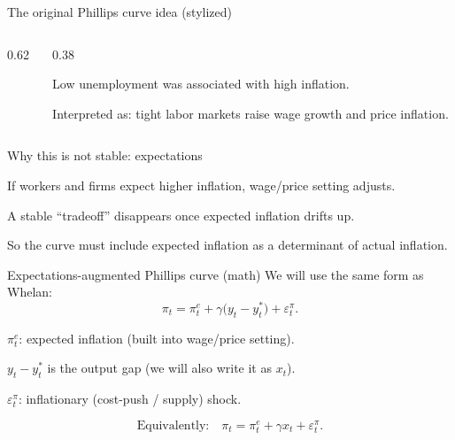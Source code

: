 \documentclass[aspectratio=169,xcolor=dvipsnames]{beamer}
\let\tempone\itemize
\let\temptwo\enditemize
\renewenvironment{itemize}{\tempone\addtolength{\itemsep}{\fill}}{\temptwo}
\newcommand{\axes}[4]{%
  \draw[axis] (#1,0) -- (#2,0);
  \draw[axis] (0,#3) -- (0,#4);
}
\newcommand{\xlabel}[1]{\node[below right] at (2.75,0) {#1};}
\newcommand{\ylabel}[1]{\node[above left] at (0,3.95) {#1};}
\begin{document}
\begin{frame}{The original Phillips curve idea (stylized)}
\begin{columns}
\begin{column}{0.62\textwidth}
\centering
{}
\end{column}
\begin{column}{0.38\textwidth}
\small
\begin{itemize}
\item Low unemployment was associated with high inflation.
\item Interpreted as: tight labor markets raise wage growth and price inflation.
\end{itemize}
\end{column}
\end{columns}
\end{frame}

\begin{frame}{Why this is not stable: expectations}
\begin{itemize}
\item If workers and firms expect higher inflation, wage/price setting adjusts.
\item A stable ``tradeoff'' disappears once expected inflation drifts up.
\item So the curve must include expected inflation as a determinant of actual inflation.
\end{itemize}
\end{frame}

\begin{frame}{Expectations-augmented Phillips curve (math)}
\small
We will use the same form as Whelan:
\[
\pi_t = \pi_t^{e} + \gamma \big(y_t-y_t^{\ast}\big) + \varepsilon_t^{\pi}.
\]
\begin{itemize}
\item $\pi_t^e$: expected inflation (built into wage/price setting).
\item $y_t-y_t^\ast$ is the output gap (we will also write it as $x_t$).
\item $\varepsilon_t^\pi$: inflationary (cost-push / supply) shock.
\end{itemize}

\vspace{0.3em}
\[
\text{Equivalently:}\quad \pi_t = \pi_t^{e} + \gamma x_t + \varepsilon_t^{\pi}.
\]
\end{frame}
\end{document}
